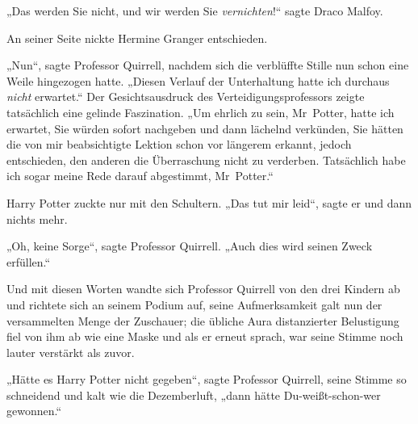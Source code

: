 „Das werden Sie nicht, und wir werden Sie \emph{vernichten}!“ sagte Draco Malfoy.

An seiner Seite nickte Hermine Granger entschieden.

„Nun“, sagte Professor Quirrell, nachdem sich die verblüffte Stille nun schon eine Weile hingezogen hatte.
„Diesen Verlauf der Unterhaltung hatte ich durchaus \emph{nicht} erwartet.“ Der Gesichtsausdruck des Verteidigungsprofessors zeigte tatsächlich eine gelinde Faszination.
„Um ehrlich zu sein, Mr~Potter, hatte ich erwartet, Sie würden sofort nachgeben und dann lächelnd verkünden, Sie hätten die von mir beabsichtigte Lektion schon vor längerem erkannt, jedoch entschieden, den anderen die Überraschung nicht zu verderben. Tatsächlich habe ich sogar meine Rede darauf abgestimmt, Mr~Potter.“

Harry Potter zuckte nur mit den Schultern.
„Das tut mir leid“, sagte er und dann nichts mehr.

„Oh, keine Sorge“, sagte Professor Quirrell.
„Auch dies wird seinen Zweck erfüllen.“

Und mit diesen Worten wandte sich Professor Quirrell von den drei Kindern ab und richtete sich an seinem Podium auf, seine Aufmerksamkeit galt nun der versammelten Menge der Zuschauer; die übliche Aura distanzierter Belustigung fiel von ihm ab wie eine Maske und als er erneut sprach, war seine Stimme noch lauter verstärkt als zuvor.

„Hätte es Harry Potter nicht gegeben“, sagte Professor Quirrell, seine Stimme so schneidend und kalt wie die Dezemberluft, „dann hätte Du-weißt-schon-wer gewonnen.“

